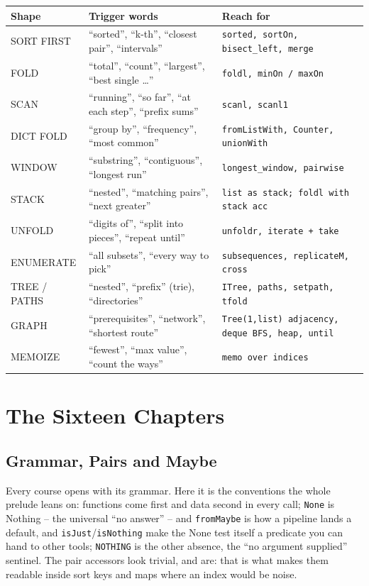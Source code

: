 \documentclass[10pt,letterpaper]{book}
\begin{document}
\begin{center}\small
\begin{tabular}{@{}p{}p{}p{}@{}}
\toprule
\textbf{Shape} & \textbf{Trigger words} & \textbf{Reach for} \\
\midrule
SORT FIRST & ``sorted'', ``k-th'', ``closest pair'', ``intervals'' & \texttt{sorted, sortOn, bisect\_left, merge} \\
FOLD & ``total'', ``count'', ``largest'', ``best single \ldots'' & \texttt{foldl, minOn / maxOn} \\
SCAN & ``running'', ``so far'', ``at each step'', ``prefix sums'' & \texttt{scanl, scanl1} \\
DICT FOLD & ``group by'', ``frequency'', ``most common'' & \texttt{fromListWith, Counter, unionWith} \\
WINDOW & ``substring'', ``contiguous'', ``longest run'' & \texttt{longest\_window, pairwise} \\
STACK & ``nested'', ``matching pairs'', ``next greater'' & \texttt{list as stack; foldl with stack acc} \\
UNFOLD & ``digits of'', ``split into pieces'', ``repeat until'' & \texttt{unfoldr, iterate + take} \\
ENUMERATE & ``all subsets'', ``every way to pick'' & \texttt{subsequences, replicateM, cross} \\
TREE / PATHS & ``nested'', ``prefix'' (trie), ``directories'' & \texttt{ITree, paths, setpath, tfold} \\
GRAPH & ``prerequisites'', ``network'', ``shortest route'' & \texttt{Tree(1,list) adjacency, deque BFS, heap, until} \\
MEMOIZE & ``fewest'', ``max value'', ``count the ways'' & \texttt{memo over indices} \\
\bottomrule
\end{tabular}
\end{center}

\tableofcontents
\mainmatter
\part{The Sixteen Chapters}
\chapter{Grammar, Pairs and Maybe}

Every course opens with its grammar. Here it is the conventions the whole
prelude leans on: functions come first and data second in every call;
\texttt{None} is Nothing -- the universal ``no answer'' -- and
\texttt{fromMaybe} is how a pipeline lands a default, and
\texttt{isJust}/\texttt{isNothing} make the None test itself a predicate you
can hand to other tools; \texttt{NOTHING} is the other absence, the ``no
argument supplied'' sentinel. The pair accessors look
trivial, and are: that is what makes them readable inside sort keys and maps
where an index would be noise.
\end{document}
